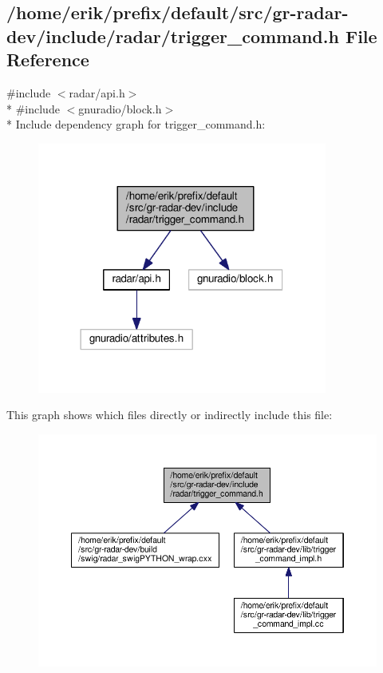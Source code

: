 \subsection{/home/erik/prefix/default/src/gr-\/radar-\/dev/include/radar/trigger\+\_\+command.h File Reference}
\label{trigger__command_8h}
{\ttfamily \#include $<$radar/api.\+h$>$}\\*
{\ttfamily \#include $<$gnuradio/block.\+h$>$}\\*
Include dependency graph for trigger\+\_\+command.\+h\+:
\nopagebreak
\begin{figure}[H]
\begin{center}
\leavevmode
\includegraphics[width=270pt]{de/daa/trigger__command_8h__incl}
\end{center}
\end{figure}
This graph shows which files directly or indirectly include this file\+:
\nopagebreak
\begin{figure}[H]
\begin{center}
\leavevmode
\includegraphics[width=350pt]{d2/dd7/trigger__command_8h__dep__incl}
\end{center}
\end{figure}
